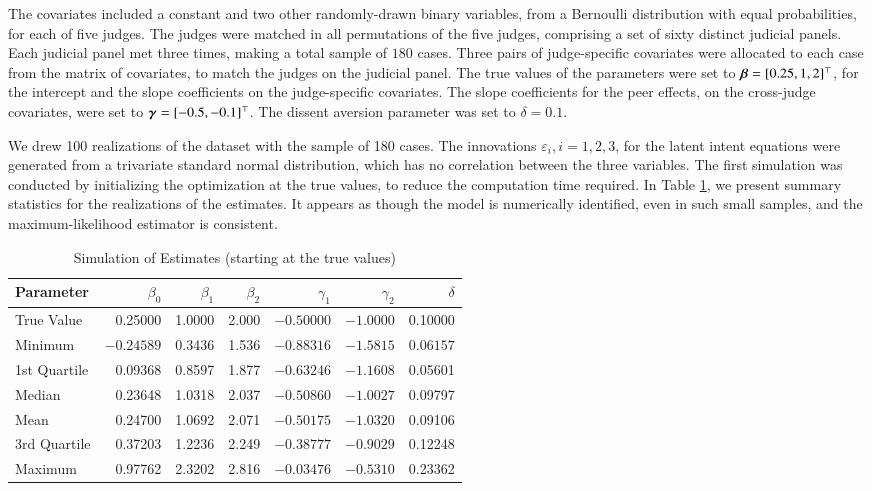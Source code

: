 \documentclass[11pt]{paper}
\begin{document}
The covariates included a constant and two other randomly-drawn binary 
variables, from a Bernoulli distribution with equal probabilities, for each 
of five judges. 
The judges were matched in all permutations of the five judges, comprising a 
set of sixty distinct judicial panels. 
Each judicial panel met three times, making a total sample of $180$ cases. 
Three pairs of judge-specific covariates were allocated to each case from
the matrix of covariates, to match the judges on the judicial panel. 
The true values of the parameters were set to
$\boldsymbol{\beta} = [0.25, 1, 2]^\top$, for the intercept and the slope coefficients 
on the judge-specific covariates. 
The slope coefficients for the peer effects, on the cross-judge covariates, 
were set to $\boldsymbol{\gamma} = [-0.5, -0.1]^\top$. 
The dissent aversion parameter was set to $\delta = 0.1$. 

We drew 100 realizations of the dataset with the sample of 180 cases.
The innovations $\varepsilon_i, i=1,2,3$, for the latent intent equations
were generated from a trivariate standard normal distribution, which has no 
correlation between the three variables. 
The first simulation was conducted by initializing the optimization at the 
true values, to reduce the computation time required. 
In Table \ref{tab:sim_warm}, we present summary statistics for the realizations
of the estimates. 
It appears as though the model is numerically identified, even in such small
samples, and the maximum-likelihood estimator is consistent.
% 
\begin{table}[ht]
\centering
\begin{tabular}{l r r r r r r}
  \hline
	Parameter 	& $\beta_0$	& $\beta_1$	& $\beta_2$	& $\gamma_1$	& $\gamma_2$	& $\delta$ \\ 
  \hline
	True Value 	&  0.25000 	&   1.0000 	&   2.000 		& $-0.50000$		&  $-1.0000$		&   0.10000  \\
  \hline
 	Minimum		& $-0.24589$  	&   0.3436   	&   1.536   	&  $-0.88316$  	&  $-1.5815$  		&   $0.06157$\\
 	1st Quartile	&  0.09368   	&   0.8597   	&   1.877   	&  $-0.63246$  	&  $-1.1608$  		&    0.05601 \\
 	Median 		&  0.23648   	&   1.0318   	&   2.037   	&  $-0.50860$  	&  $-1.0027$  		&    0.09797 \\
 	Mean   		&  0.24700   	&   1.0692   	&   2.071   	&  $-0.50175$  	&  $-1.0320$  		&    0.09106 \\
 	3rd Quartile	&  0.37203   	&   1.2236   	&   2.249   	&  $-0.38777$  	&  $-0.9029$  		&    0.12248 \\
 	Maximum   	&  0.97762   	&   2.3202   	&   2.816   	&  $-0.03476$  	&  $-0.5310$  		&    0.23362 \\
   \hline
\end{tabular}
\caption{Simulation of Estimates (starting at the true values)} 
\label{tab:sim_warm}
\end{table}
\end{document}
